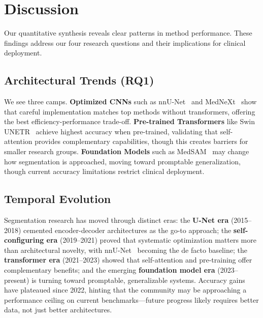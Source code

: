 \documentclass[conference]{IEEEtran}
\begin{document}
\FloatBarrier

\section{Discussion}
\label{sec:discussion}

Our quantitative synthesis reveals clear patterns in method performance. These findings address our four research questions and their implications for clinical deployment.

\subsection{Architectural Trends (RQ1)}

We see three camps. \textbf{Optimized CNNs} such as nnU-Net~\cite{isensee2021nnunet} and MedNeXt~\cite{roy2023mednext} show that careful implementation matches top methods without transformers, offering the best efficiency-performance trade-off. \textbf{Pre-trained Transformers} like Swin UNETR~\cite{swinunetr2022} achieve highest accuracy when pre-trained, validating that self-attention provides complementary capabilities, though this creates barriers for smaller research groups. \textbf{Foundation Models} such as MedSAM~\cite{ma2024medsam} may change how segmentation is approached, moving toward promptable generalization, though current accuracy limitations restrict clinical deployment.

\subsection{Temporal Evolution}

Segmentation research has moved through distinct eras: the \textbf{U-Net era} (2015--2018) cemented encoder-decoder architectures as the go-to approach; the \textbf{self-configuring era} (2019--2021) proved that systematic optimization matters more than architectural novelty, with nnU-Net~\cite{isensee2021nnunet} becoming the de facto baseline; the \textbf{transformer era} (2021--2023) showed that self-attention and pre-training offer complementary benefits; and the emerging \textbf{foundation model era} (2023--present) is turning toward promptable, generalizable systems. Accuracy gains have plateaued since 2022, hinting that the community may be approaching a performance ceiling on current benchmarks---future progress likely requires better data, not just better architectures.
\end{document}
